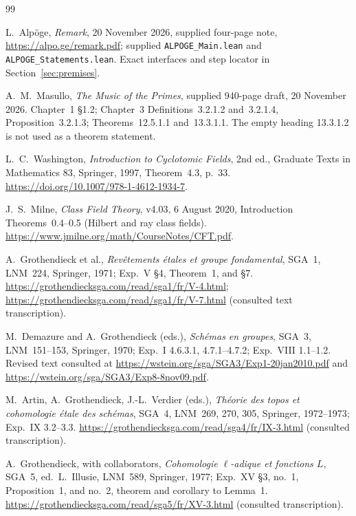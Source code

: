 \documentclass[11pt,a4paper]{article}
\begin{document}
\clearpage\begin{thebibliography}{99}

 L.~Alp\"oge, \emph{Remark}, 20 November 2026, supplied four-page note,
\url{https://alpo.ge/remark.pdf}; supplied \texttt{ALPOGE\_Main.lean} and
\texttt{ALPOGE\_Statements.lean}. Exact interfaces and step locator in Section~\ref{sec:premises}.


 A.~M.~Masullo, \emph{The Music of the Primes}, supplied 940-page draft,
20 November 2026. Chapter~1 \S1.2; Chapter~3 Definitions~3.2.1.2 and~3.2.1.4,
Proposition~3.2.1.3; Theorems~12.5.1.1 and~13.3.1.1. The empty heading
13.3.1.2 is not used as a theorem statement.


 L.~C.~Washington, \emph{Introduction to Cyclotomic Fields},
2nd ed., Graduate Texts in Mathematics 83, Springer, 1997, Theorem~4.3, p.~33.
\url{https://doi.org/10.1007/978-1-4612-1934-7}.


 J.~S.~Milne, \emph{Class Field Theory}, v4.03, 6 August 2020,
Introduction Theorems~0.4--0.5 (Hilbert and ray class fields).
\url{https://www.jmilne.org/math/CourseNotes/CFT.pdf}.


 A.~Grothendieck et al., \emph{Rev\^etements \'etales et groupe fondamental},
SGA~1, LNM~224, Springer, 1971; Exp.~V \S4, Theorem~1, and \S7.
\url{https://grothendiecksga.com/read/sga1/fr/V-4.html};
\url{https://grothendiecksga.com/read/sga1/fr/V-7.html} (consulted text transcription).


 M.~Demazure and A.~Grothendieck (eds.), \emph{Sch\'emas en groupes},
SGA~3, LNM~151--153, Springer, 1970; Exp.~I 4.6.3.1, 4.7.1--4.7.2;
Exp.~VIII 1.1--1.2. Revised text consulted at
\url{https://wstein.org/sga/SGA3/Exp1-20jan2010.pdf} and
\url{https://wstein.org/sga/SGA3/Exp8-8nov09.pdf}.


 M.~Artin, A.~Grothendieck, J.-L.~Verdier (eds.),
\emph{Th\'eorie des topos et cohomologie \'etale des sch\'emas}, SGA~4,
LNM~269, 270, 305, Springer, 1972--1973; Exp.~IX 3.2--3.3.
\url{https://grothendiecksga.com/read/sga4/fr/IX-3.html} (consulted transcription).


 A.~Grothendieck, with collaborators, \emph{Cohomologie $\ell$-adique
et fonctions $L$}, SGA~5, ed.~L.~Illusie, LNM~589, Springer, 1977;
Exp.~XV \S3, no.~1, Proposition~1, and no.~2, theorem and corollary to Lemma~1.
\url{https://grothendiecksga.com/read/sga5/fr/XV-3.html} (consulted transcription).



\end{thebibliography}
\end{document}
